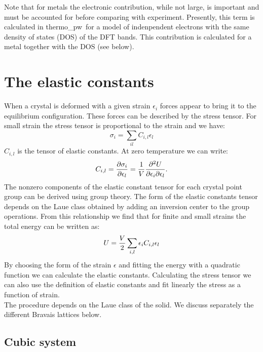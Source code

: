 \documentclass[12pt,a4paper]{article}
\def\tpw{{\sc thermo\_pw}}
\begin{document}
Note that for metals the electronic contribution, while not large, is important 
and must be accounted for before comparing with experiment. Presently,
this term is calculated in \tpw\ for a model of indenpendent electrons with
the same density of states (DOS) of the DFT bands. This contribution is 
calculated for a metal together with the DOS (see below).

\newpage
\section{\color{coral}The elastic constants}

When a crystal is deformed with a given strain $\epsilon_i$ forces
appear to bring it to the equilibrium configuration. These
forces can be described by the stress tensor. For small strain the 
stress tensor is proportional to the strain and we have:
\begin{equation}
\sigma_{i} =\sum_{il} C_{i,l} \epsilon_l 
\end{equation}
$C_{i,l}$ is the tensor of elastic constants. 
At zero temperature we can write:
\begin{equation}
C_{i,l}= {\partial \sigma_i \over \partial \epsilon_{l}}=
{1 \over V}{\partial^2 U \over \partial \epsilon_i \partial \epsilon_l}
.
\end{equation}
The nonzero components of the elastic constant tensor for each crystal point
group can be derived using group theory. The form of the elastic constants
tensor depends on the Laue class obtained by adding an inversion center to
the group operations. From this relationship we find that for finite
and small strains the total energy can be written as:
\begin{equation}
U= {V \over 2} \sum_{i,l} \epsilon_i C_{i,l} \epsilon_l
\end{equation}
By choosing the form of the strain $\epsilon$ and fitting the
energy with a quadratic function we can calculate the elastic constants.
Calculating the stress tensor we can also use the definition
of elastic constants and fit linearly the stress as a function of strain. \\
The procedure depends on the Laue class of the solid. We discuss separately
the different Bravais lattices below.

\subsection{\color{web-blue}Cubic system}
\end{document}
